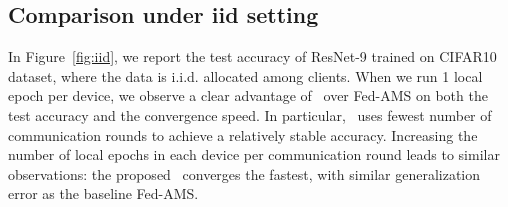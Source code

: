 \documentclass[twoside]{article}
\begin{document}
\subsection{Comparison under iid setting}

In Figure~\ref{fig:iid}, we report the test accuracy of ResNet-9 trained on CIFAR10 dataset, where the data is i.i.d. allocated among clients.
When we run 1 local epoch per device, we observe a clear advantage of \algo\ over Fed-AMS on both the test accuracy and the convergence speed. In particular, \algo\ uses fewest number of communication rounds to achieve a relatively stable accuracy. Increasing the number of local epochs in each device per communication round leads to similar observations: the proposed \algo\ converges the fastest, with similar generalization error as the baseline Fed-AMS. 
\end{document}
